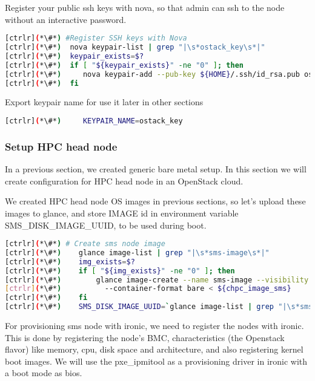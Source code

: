 	Register your public ssh keys with nova, so that admin can ssh to the node without an interactive password.


\begin{lstlisting}[language=bash,keywords={}]
[ctrlr](*\#*) #Register SSH keys with Nova
[ctrlr](*\#*)  nova keypair-list | grep "|\s*ostack_key\s*|"
[ctrlr](*\#*)  keypair_exists=$?
[ctrlr](*\#*)  if [ "${keypair_exists}" -ne "0" ]; then
[ctrlr](*\#*)     nova keypair-add --pub-key ${HOME}/.ssh/id_rsa.pub ostack_key
[ctrlr](*\#*)  fi
\end{lstlisting} 

	Export keypair name for use it later in other sections


\begin{lstlisting}[language=bash,keywords={}]
[ctrlr](*\#*)     KEYPAIR_NAME=ostack_key
\end{lstlisting} 
\newpage
\subsubsection{Setup HPC head node}


	In a previous section, we created generic bare metal setup. In this section we will create configuration for HPC head node in an OpenStack cloud.
	
	We created HPC head node OS images in previous sections, so let's upload these images to glance, and store IMAGE id in environment variable SMS\_DISK\_IMAGE\_UUID, to be used during boot. 

\begin{lstlisting}[language=bash,keywords={}]
[ctrlr](*\#*) # Create sms node image
[ctrlr](*\#*)    glance image-list | grep "|\s*sms-image\s*|"
[ctrlr](*\#*)    img_exists=$?
[ctrlr](*\#*)    if [ "${img_exists}" -ne "0" ]; then
[ctrlr](*\#*)        glance image-create --name sms-image --visibility public --disk-format qcow2 \
[ctrlr](*\#*)          --container-format bare < ${chpc_image_sms}
[ctrlr](*\#*)    fi
[ctrlr](*\#*)    SMS_DISK_IMAGE_UUID=`glance image-list | grep "|\s*sms-image\s*|" | awk '{print $2}'`
\end{lstlisting} 

	For provisioning sms node with ironic, we need to register the nodes with ironic. This is done by registering the node's BMC, characteristics (the Openstack flavor) like memory, cpu, disk space and architecture, and also registering kernel boot images. We will use the pxe\_ipmitool as a provisioning driver in ironic with a boot mode as bios.

